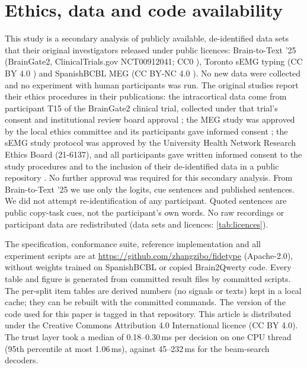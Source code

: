\section*{Ethics, data and code availability}
\label{sec:ethics}
\label{sec:availability}

This study is a secondary analysis of publicly available, de-identified data sets that their original investigators released under public licences: Brain-to-Text '25 (BrainGate2, ClinicalTrials.gov NCT00912041; CC0 \citep{card2025data}), Toronto sEMG typing (CC BY 4.0 \citep{achituve2024data}) and SpanishBCBL MEG (CC BY-NC 4.0 \citep{spanishbcbl}). No new data were collected and no experiment with human participants was run. The original studies report their ethics procedures in their publications: the intracortical data come from participant T15 of the BrainGate2 clinical trial, collected under that trial's consent and institutional review board approval \citep{card2024accurate}; the MEG study was approved by the local ethics committee and its participants gave informed consent \citep{levy2026brain2qwerty}; the sEMG study protocol was approved by the University Health Network Research Ethics Board (21-6137), and all participants gave written informed consent to the study procedures and to the inclusion of their de-identified data in a public repository \citep{achituve2025emg}. No further approval was required for this secondary analysis. From Brain-to-Text '25 we use only the logits, cue sentences and published sentences. We did not attempt re-identification of any participant. Quoted sentences are public copy-task cues, not the participant's own words. No raw recordings or participant data are redistributed (data sets and licences: \cref{tab:licences}).

The \nts{} specification, conformance suite, reference implementation and all experiment scripts are at \url{https://github.com/zhangzibo/fidetype} (Apache-2.0), without weights trained on SpanishBCBL or copied Brain2Qwerty code. Every table and figure is generated from committed result files by committed scripts. The per-split item tables are derived numbers (no signals or texts) kept in a local cache; they can be rebuilt with the committed commands. The version of the code used for this paper is tagged  in that repository. This article is distributed under the Creative Commons Attribution 4.0 International licence (CC BY 4.0). The trust layer took a median of 0.18--0.30\,ms per decision on one CPU thread (95th percentile at most 1.06\,ms), against 45--232\,ms for the beam-search decoders.
